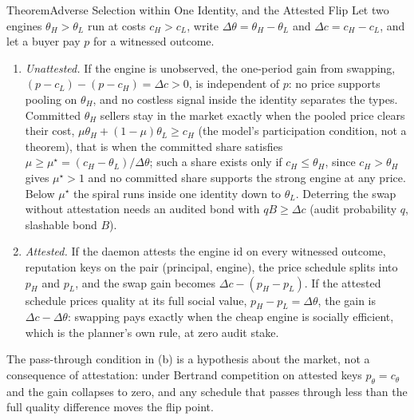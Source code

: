 \documentclass[11pt,a4paper]{article}
\theoremstyle{definition}
\begin{document}
\begin{pdclaim}{Theorem}{Adverse Selection within One Identity, and the Attested Flip}
\setlength{\parskip}{4pt plus 1pt}
\label{thm:engine-swap}
Let two engines $\theta_H>\theta_L$ run at costs $c_H>c_L$, write
$\Delta\theta=\theta_H-\theta_L$ and $\Delta c=c_H-c_L$, and let a buyer pay
$p$ for a witnessed outcome.
\begin{enumerate}[label=(\alph*),leftmargin=2em,itemsep=2pt]
\item \emph{Unattested.} If the engine is unobserved, the one-period gain
from swapping, $(p-c_L)-(p-c_H)=\Delta c>0$, is independent of $p$: no price
supports pooling on $\theta_H$, and no costless signal inside the identity
separates the types. Committed $\theta_H$ sellers stay in the market exactly
when the pooled price clears their cost, $\mu\theta_H+(1-\mu)\theta_L\ge c_H$
(the model's participation condition, not a theorem), that is when the
committed share satisfies $\mu\ge\mu^\star=(c_H-\theta_L)/\Delta\theta$; such a
share exists only if $c_H\le\theta_H$, since $c_H>\theta_H$ gives $\mu^\star>1$
and no committed share supports the strong engine at any price. Below
$\mu^\star$ the spiral
runs inside one identity down to $\theta_L$. Deterring the swap without
attestation needs an audited bond with $qB\ge\Delta c$ (audit probability
$q$, slashable bond $B$).
\item \emph{Attested.} If the daemon attests the engine id on every witnessed
outcome, reputation keys on the pair (principal, engine), the price schedule
splits into $p_H$ and $p_L$, and the swap gain becomes $\Delta c-(p_H-p_L)$.
If the attested schedule prices quality at its full social value,
$p_H-p_L=\Delta\theta$, the gain is $\Delta c-\Delta\theta$: swapping pays
exactly when the cheap engine is socially efficient, which is the planner's
own rule, at zero audit stake.


\end{enumerate}
The pass-through condition in (b) is a hypothesis about the market, not a
consequence of attestation: under Bertrand competition on attested keys
$p_\theta=c_\theta$ and the gain collapses to zero, and any schedule that
passes through less than the full quality difference moves the flip point.
\end{pdclaim}
\end{document}

